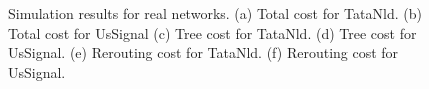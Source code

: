 \documentclass[10pt, conference, letterpaper]{IEEEtran}
\theoremstyle{definition}
\begin{document}

\begin{figure}[t!]
\centering
{}
\\ \vspace{-4mm}
\\ \vspace{-4mm}
\caption{Simulation results for real networks. (a) Total cost for TataNld. (b) Total cost for UsSignal (c) Tree cost for TataNld. (d) Tree cost for UsSignal. (e) Rerouting cost for TataNld. (f) Rerouting cost for UsSignal.}
\label{f:small_topo}
\end{figure}
\end{document}
